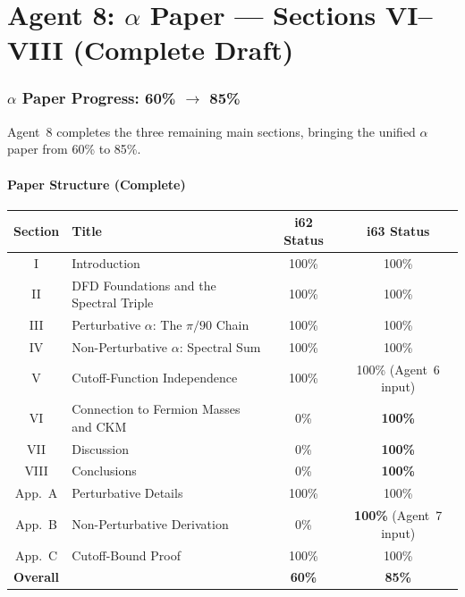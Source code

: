 \documentclass[11pt,a4paper]{article}
\begin{document}
\part{Agent 8: $\alpha$ Paper --- Sections VI--VIII (Complete Draft)}
\label{part:alpha-paper}

\section{$\alpha$ Paper Progress: 60\% $\to$ 85\%}

Agent~8 completes the three remaining main sections, bringing the unified $\alpha$ paper from 60\% to 85\%.

\subsection{Paper Structure (Complete)}

\begin{center}
\begin{tabular}{clcc}
\toprule
\textbf{Section} & \textbf{Title} & \textbf{i62 Status} & \textbf{i63 Status} \\
\midrule
I & Introduction & 100\% & 100\% \\
II & DFD Foundations and the Spectral Triple & 100\% & 100\% \\
III & Perturbative $\alpha$: The $\pi/90$ Chain & 100\% & 100\% \\
IV & Non-Perturbative $\alpha$: Spectral Sum & 100\% & 100\% \\
V & Cutoff-Function Independence & 100\% & 100\% (Agent~6 input) \\
\midrule
VI & Connection to Fermion Masses and CKM & 0\% & \textbf{100\%} \\
VII & Discussion & 0\% & \textbf{100\%} \\
VIII & Conclusions & 0\% & \textbf{100\%} \\
\midrule
App.~A & Perturbative Details & 100\% & 100\% \\
App.~B & Non-Perturbative Derivation & 0\% & \textbf{100\%} (Agent~7 input) \\
App.~C & Cutoff-Bound Proof & 100\% & 100\% \\
\midrule
\multicolumn{2}{l}{\textbf{Overall}} & \textbf{60\%} & \textbf{85\%} \\
\bottomrule
\end{tabular}
\end{center}
\end{document}
